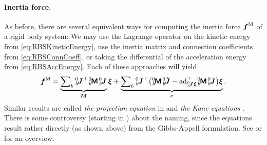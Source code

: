 \paragraph{Inertia force.}
As before, there are several equivalent ways for computing the inertia force $\boldsymbol{f}^{\mathrm{M}}$ of a rigid body system:
We may use the Lagrange operator on the kinetic energy from \eqref{eq:RBSKineticEnergy}, use the inertia matrix and connection coefficients from \eqref{eq:RBSConnCoeff}, or taking the differential of the acceleration energy from \eqref{eq:RBSAccEnergy}.
Each of these approaches will yield
\begin{align}\label{eq:RBSInertiaForce}
 \genForceInertia 
 = \underbrace{\sumBodies \bodyJac{0}{\BidxII}^\top \bodyInertiaMat{0}{\BidxII} \bodyJac{0}{\BidxII}}_{\sysInertiaMat} \sysVeld
 + \underbrace{\sumBodies \bodyJac{0}{\BidxII}^\top \big(\bodyInertiaMat{0}{\BidxII} \bodyJacd{0}{\BidxII} - \ad{\bodyJac{0}{\BidxII}\sysVel}^\top \bodyInertiaMat{0}{\BidxII}\bodyJac{0}{\BidxII} \big) \sysVel}_{\gyroForce}.
\end{align}
Similar results are called \textit{the projection equation} in \cite[sec.\ 4.2.5]{Bremer:ElasticMultibodyDynamics} and \textit{the Kane equations} \cite[chap.\ 6]{Kane:Dynamics}.
There is some controversy (starting in \cite{Desloge:KaneAppell}) about the naming, since the equations result rather directly (as shown above) from the Gibbs-Appell formulation.
See \cite{Lesser:GeometricInterpretationOfKanesEquations} or \cite[p.\ 714]{Papastavridis:AnalyticalMechanics} for an overview.

